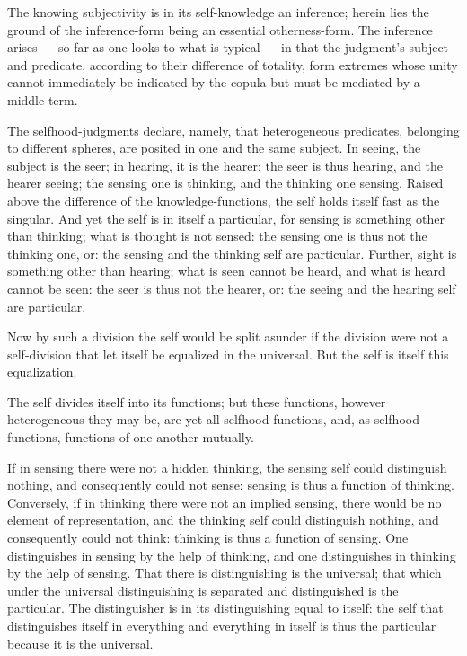 \documentclass[12pt]{book}
\begin{document}
The knowing subjectivity is in its self-knowledge an
inference; herein lies the ground of the inference-form being an
essential otherness-form. The inference arises --- so far as one
looks to what is typical --- in that the judgment's subject and
predicate, according to their difference of totality, form extremes
whose unity cannot immediately be indicated by the copula but must
be mediated by a middle term.

The selfhood-judgments declare, namely, that heterogeneous
predicates, belonging to different spheres, are posited in one and
the same subject. In seeing, the subject is the seer; in hearing, it
is the hearer; the seer is thus hearing, and the hearer seeing; the
sensing one is thinking, and the thinking one sensing. Raised above
the difference of the knowledge-functions, the self holds itself
fast as the singular. And yet the self is in itself a particular,
for sensing is something other than thinking; what is thought is not
sensed: the sensing one is thus not the thinking one, or: the
sensing and the thinking self are particular. Further, sight is
something other than hearing; what is seen cannot be heard, and what
is heard cannot be seen: the seer is thus not the hearer, or: the
seeing and the hearing self are particular.

Now by such a division the self would be split asunder if the
division were not a self-division that let itself be equalized in
the universal. But the self is itself this equalization.

The self divides itself into its functions; but these functions,
however heterogeneous they may be, are yet all selfhood-functions,
and, as selfhood-functions, functions of one another mutually.

If in sensing there were not a hidden thinking, the sensing self
could distinguish nothing, and consequently could not sense: sensing
is thus a function of thinking. Conversely, if in thinking there
were not an implied sensing, there would be no element of
representation, and the thinking self could distinguish nothing, and
consequently could not think: thinking is thus a function of
sensing. One distinguishes in
sensing by the help of thinking, and one distinguishes in thinking
by the help of sensing. That there is distinguishing is the
universal; that which under the universal distinguishing is
separated and distinguished is the particular. The distinguisher is
in its distinguishing equal to itself: the self that distinguishes
itself in everything and everything in itself is thus the particular
because it is the universal.
\end{document}
